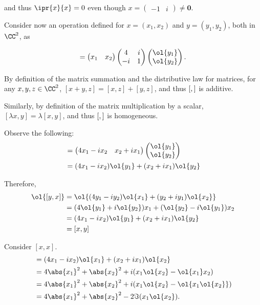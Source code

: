 \documentclass[11pt]{scrartcl}
\begin{document}
and thus $\ipr{x}{x} = 0$ even though $x =
\begin{pmatrix}
-1 & i
\end{pmatrix}\neq \bm{0}
$.

Consider now an operation defined for $x= (x_1, x_2)$ and
$y = (y_1, y_2)$, both in $\CC^2$, as

\begin{equation}
  [x, y] =
  \begin{pmatrix}
    x_1 & x_2
  \end{pmatrix}
  \begin{pmatrix}
    4 & i\\
    -i & 1
  \end{pmatrix}
  \begin{pmatrix}
    \ol{y_1}\\
    \ol{y_{2}}
  \end{pmatrix}.
\end{equation}

By definition of the matrix summation and the distributive law for
matrices, for any $x, y, z \in \CC^2$, $[x+y, z] = [x, z] + [y, z]$,
and thus $[\*, \*]$ is additive.

Similarly, by definition of the matrix multiplication by a scalar,
$[\lambda x, y] = \lambda [x, y]$, and thus $[\*, \*]$ is homogeneous.

Observe the following:
\begin{align}
  [x, y]          & =
  \begin{pmatrix}
    4x_1 - ix_{2} & x_2+ix_1
  \end{pmatrix}
  \begin{pmatrix}
    \ol{y_1}    \\
    \ol{y_{2}}
  \end{pmatrix} \\
                  & = (4x_1 - ix_{2})\ol{y_1} +  (x_2+ix_1)\ol{y_{2}}
\end{align}

Therefore,
\begin{align}
  \ol{[y, x]} & = \ol{(4y_1 - iy_{2})\ol{x_1} +  (y_2+iy_1)\ol{x_{2}}}      \\
              & = (4\ol{y_1} + i \ol{y_2})x_1 + (\ol{y_2} - i\ol{y_1})x_{2} \\
              & = (4x_1 - ix_{2})\ol{y_1} +  (x_2+ix_1)\ol{y_{2}}           \\
              & = [x,y]
\end{align}

Consider $[x, x]$.
\begin{align}
  [x,x] & = (4x_1 - ix_{2})\ol{x_1} + (x_2+ix_1)\ol{x_{2}} \\
        & = 4 \abs{x_1}^2 + \abs{x_2}^2 + i(x_1\ol{x_2}-\ol{x_1}x_2)\\
        & = 4 \abs{x_1}^2 + \abs{x_2}^2 + i(x_1\ol{x_2}-\ol{x_1\ol{x_2}})\\
  \label{eq:1}
        & = 4 \abs{x_1}^2 + \abs{x_2}^2 - 2\Im(x_{1}\ol{x_2}).
\end{align}
\end{document}
